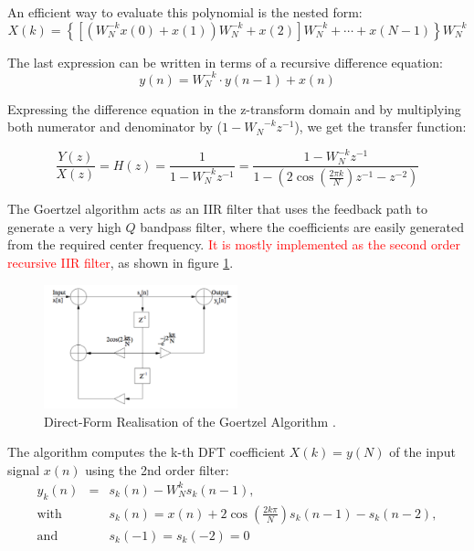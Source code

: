 \documentclass[12pt,a4paper,openright]{report}
\begin{document}
An efficient way to evaluate this polynomial is the nested form:
\begin{equation}
X(k) = \left\{ {\left[ {\left( {W_N^{ - k}x(0) + x(1)} \right)W_N^{ - k} + x(2)} \right]W_N^{ - k} +  \cdots  + x(N - 1)} \right\}W_N^{ - k}
\end{equation}

The last expression can be written in terms of a recursive difference equation:
\begin{equation}
y(n) = {W^{ - k}_N}\cdot y(n - 1) + x(n)
\end{equation}
\[
\]

Expressing the difference equation in the z-transform domain and by multiplying both numerator and denominator by (${1 - {W_N}^{ - k}{z^{ - 1}}}$), we get the transfer function:

\begin{equation}
\frac{{Y(z)}}{{X(z)}} = H(z) = \frac{1}{{1 - {W_N^{ - k}}{z^{ - 1}}}} = \frac{{1 - W_N^{ - k}{z^{ - 1}}}}{{1 - (2\cos (\frac{{2\pi k}}{N}){z^{ - 1}} - {z^{ - 2}})}}
\end{equation}

The Goertzel algorithm acts as an IIR filter that uses the feedback path to generate a very high $Q$ bandpass filter, where the coefficients are easily generated from the required center frequency.  \textcolor{red}{It is mostly implemented as the second order recursive IIR filter}, as shown in figure \ref{fig:IIR}. 

 \begin{figure}[H]
  \centering
    \includegraphics[width=0.5\textwidth]{IIR.pdf}
    \caption[Direct-Form realisation of the Goertzel algorithm]{Direct-Form Realisation of the Goertzel Algorithm \protect\cite{HaykinBook}.}
    \label{fig:IIR}
\end{figure}


The algorithm computes the k-th DFT coefficient $X(k)=y(N)$ of the input signal $x(n)$ using the 2nd order filter:
\begin{equation}
\begin{array}{lll}
{y_k}(n) & = & {s_k}(n) - W_N^k{s_k}(n - 1),\\
\text{with } & &{s_k}(n) = x(n) + 2\cos (\frac{{2k\pi }}{N}){s_k}(n - 1) - {s_k}(n - 2),\\
\text{and } & & {s_k}( - 1) = {s_k}( - 2) = 0

\end{array}
\label{fig:IIRtime}
\end{equation}
\end{document}
